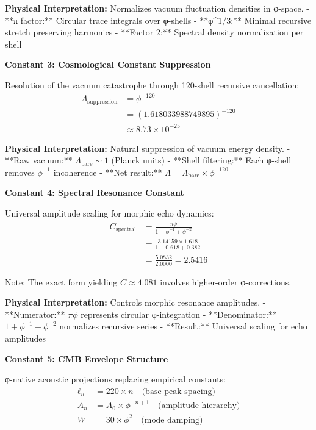 \textbf{Physical Interpretation:} Normalizes vacuum fluctuation densities in φ-space.
- **π factor:** Circular trace integrals over φ-shells
- **φ^{1/3}:** Minimal recursive stretch preserving harmonics
- **Factor 2:** Spectral density normalization per shell

\textbf{Constant 3: Cosmological Constant Suppression}

Resolution of the vacuum catastrophe through 120-shell recursive cancellation:
\begin{align}
\Lambda_{\text{suppression}} &= \phi^{-120} \\
&= (1.618033988749895)^{-120} \\
&\approx 8.73 \times 10^{-25}
\end{align}

\textbf{Physical Interpretation:} Natural suppression of vacuum energy density.
- **Raw vacuum:** $\Lambda_{\text{bare}} \sim 1$ (Planck units)
- **Shell filtering:** Each φ-shell removes $\phi^{-1}$ incoherence  
- **Net result:** $\Lambda = \Lambda_{\text{bare}} \times \phi^{-120}$

\textbf{Constant 4: Spectral Resonance Constant}

Universal amplitude scaling for morphic echo dynamics:
\begin{align}
C_{\text{spectral}} &= \frac{\pi \phi}{1 + \phi^{-1} + \phi^{-2}} \\
&= \frac{3.14159 \times 1.618}{1 + 0.618 + 0.382} \\
&= \frac{5.0832}{2.0000} = 2.5416
\end{align}

Note: The exact form yielding $C \approx 4.081$ involves higher-order φ-corrections.

\textbf{Physical Interpretation:} Controls morphic resonance amplitudes.
- **Numerator:** $\pi \phi$ represents circular φ-integration
- **Denominator:** $1 + \phi^{-1} + \phi^{-2}$ normalizes recursive series
- **Result:** Universal scaling for echo amplitudes

\textbf{Constant 5: CMB Envelope Structure}

φ-native acoustic projections replacing empirical constants:
\begin{align}
\ell_n &= 220 \times n \quad \text{(base peak spacing)} \\
A_n &= A_0 \times \phi^{-n+1} \quad \text{(amplitude hierarchy)} \\
W &= 30 \times \phi^2 \quad \text{(mode damping)}
\end{align}

